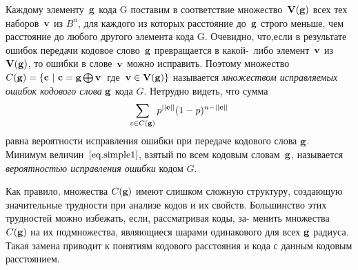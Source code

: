 \documentclass[12pt]{article}
\numberwithin{equation}{section}
\begin{document}
Каждому элементу~$\bf{g}$ кода G поставим в соответствие множество~$\bf{V}(\bf{g})$ всех тех наборов~$\bf{v}$ из $B^n$, для каждого из которых расстояние до~$\bf{g}$ строго меньше, чем расстояние до любого другого элемента кода G. Очевидно, что,если в результате ошибок передачи кодовое слово~$\bf{g}$ превращается в какой-~либо элемент~$\bf{v}$ из~$\bf{V}(\bf{g})$, то ошибки в слове~$\bf{v}$ можно исправить. Поэтому множество $C(\bf g) = \{ \bf c~|~\bf c = \bf g\bigoplus \bf v$~где~$\bf v \in V (\bf g)\}$ называется {\it множеством исправляемых ошибок кодового слова} $\bf{g}$ кода $G$. Нетрудно видеть, что сумма
\begin{equation}
\sum_{c\in C(\bf g)}p^{||\bf{c}||}(1-p)^{n-||\bf c||}
\label{eq.simple1} 
\end{equation}
равна вероятности исправления ошибки при передаче кодового слова $\bf g$. Минимум величин~$\eqref{eq.simple1}$, взятый по всем кодовым словам~$\bf g$, называется {\it вероятностью исправления ошибки} кодом $G$.

Как правило, множества $C(\bf g)$ имеют слишком сложную структуру, создающую значительные трудности при анализе кодов и их свойств. Большинство этих трудностей можно избежать, если, рассматривая коды, за-
менить множества~$C(\bf g)$ на их подмножества, являющиеся шарами одинакового для всех $\bf g$ радиуса. Такая замена приводит к понятиям кодового расстояния и кода с данным кодовым расстоянием.
\end{document}
